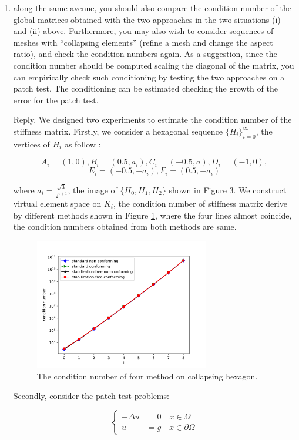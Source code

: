 \documentclass[10pt]{amsart}
\theoremstyle{definition}
\theoremstyle{remark}
\begin{document}
\begin{enumerate}[1.]
\item \textsf{
along the same avenue, you should also compare the condition number of the
global matrices obtained with the two approaches in the two situations (i) and
(ii) above. Furthermore, you may also wish to consider sequences of meshes with
“collapsing elements” (refine a mesh and change the aspect ratio), and check the
condition numbers again.  As a suggestion, since the condition number should be
computed scaling the diagonal of the matrix, you can empirically check such
conditioning by testing the two approaches on a patch test. The conditioning can
be estimated checking the growth of the error for the patch test.
}

\smallskip \noindent \textcolor[rgb]{1.00,0.00,0.00}{Reply.}
We designed two experiments to estimate the condition number of the stiffness
matrix. Firstly, we consider a hexagonal sequence $\{H_i\}_{i=0}^{\infty}$, the
vertices of $H_i$ as follow :

$$
A_i = (1, 0), B_i = (0.5, a_i), C_i = (-0.5, a), D_i=(-1, 0), 
$$
$$
E_i = (-0.5, -a_i), F_i = (0.5, -a_i)
$$

where $a_i = \frac{\sqrt{3}}{2^{i+1}}$, the image of $\{H_0, H_1, H_2\}$ shown
in Figure 3. 
We construct virtual element space on $K_i$, the condition number of stiffness
matrix derive by different methods shown in Figure
\ref{fig:collapsehexagon_conditionnumber}, where the four lines
almost coincide, the condition numbers obtained from both methods are same.

\begin{figure}[h]
\centering
\includegraphics[width=3.0in]{../figures/collapsing_condition_number.pdf}
\caption{The condition number of four method on collapsing hexagon.}
  \label{fig:collapsehexagon_conditionnumber} %
\end{figure}

Secondly,  consider the patch test problems:

$$
\left\{\begin{aligned}
-\Delta u & = 0 \quad x \in \Omega\\
u & = g \quad x \in \partial \Omega
\end{aligned}\right.
$$


\end{enumerate}
\end{document}
